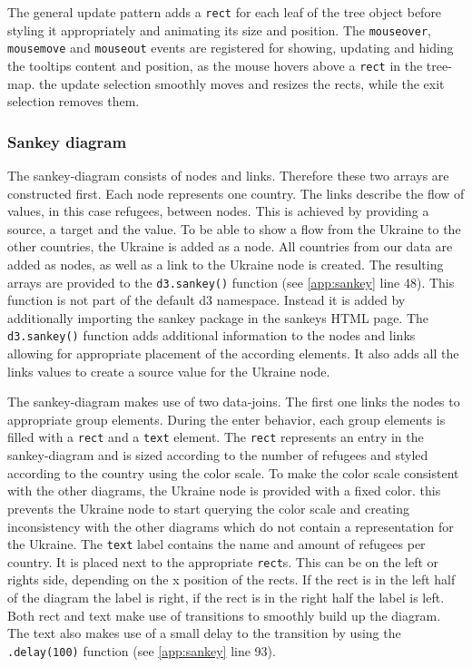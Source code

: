 The general update pattern adds a \texttt{rect} for each leaf of the tree object before styling it appropriately and animating its size and position. The \texttt{mouseover}, \texttt{mousemove} and \texttt{mouseout} events are registered for showing, updating and hiding the tooltips content and position, as the mouse hovers above a \texttt{rect} in the tree-map. the update selection smoothly moves and resizes the rects, while the exit selection removes them.


\subsubsection{Sankey diagram}

The sankey-diagram consists of nodes and links. Therefore these two arrays are constructed first. Each node represents one country. The links describe the flow of values, in this case refugees, between nodes. This is achieved by providing a source, a target and the value. To be able to show a flow from the Ukraine to the other countries, the Ukraine is added as a node. All countries from our data are added as nodes, as well as a link to the Ukraine node is created. The resulting arrays are provided to the \texttt{d3.sankey()} function (see \ref{app:sankey} line 48). This function is not part of the default d3 namespace. Instead it is added by additionally importing the sankey package in the sankeys HTML page. The \texttt{d3.sankey()} function adds additional information to the nodes and links allowing for appropriate placement of the according elements. It also adds all the links values to create a source value for the Ukraine node.

The sankey-diagram makes use of two data-joins. The first one links the nodes to appropriate group elements. During the enter behavior, each group elements is filled with a \texttt{rect} and a \texttt{text} element. The \texttt{rect} represents an entry in the sankey-diagram and is sized according to the number of refugees and styled according to the country using the color scale. To make the color scale consistent with the other diagrams, the Ukraine node is provided with a fixed color. this prevents the Ukraine node to start querying the color scale and creating inconsistency with the other diagrams which do not contain a representation for the Ukraine. The \texttt{text} label contains the name and amount of refugees per country. It is placed next to the appropriate \texttt{rect}s. This can be on the left or rights side, depending on the x position of the rects. If the rect is in the left half of the diagram the label is right, if the rect is in the right half the label is left. Both rect and text make use of transitions to smoothly build up the diagram. The text also makes use of a small delay to the transition by using the \texttt{.delay(100)} function (see \ref{app:sankey} line 93).

